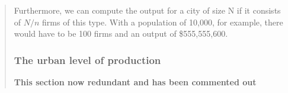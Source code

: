 \begin{enumerate}
\begin{quotation}

Furthermore, we can compute the output for a city of size N if it consists of $N/n$ firms of this type. With a population of 10,000, for example,  there would have to be  100 firms and an output of \$555,555,600. 

 \subsubsection{The urban level of production}
 \textbf{This section now redundant and has been commented out}








\end{quotation}
\end{enumerate}
